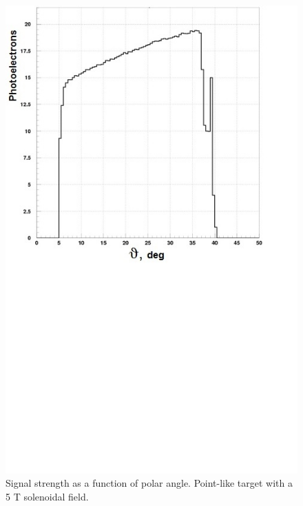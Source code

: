 \begin{figure}[!ht]
    \centering
    \includegraphics[width=1.0\linewidth,trim={0.0cm 9.4cm 0.0cm 0.0cm},clip]{images/Point_Targ_5T_Field_Theta.jpg}
    \caption{Signal strength as a function of polar angle. Point-like target with a 5 T solenoidal field.}
    \label{fig:Point_Targ_5T_Field_Theta}
\end{figure}

